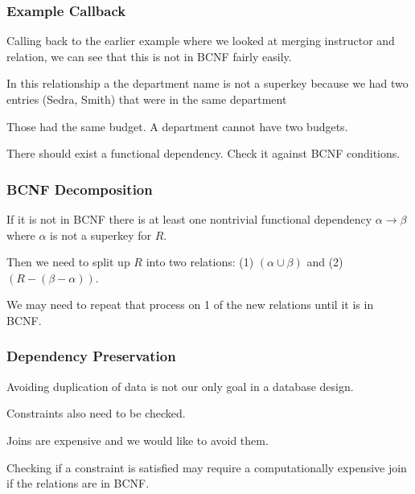\begin{frame}
\frametitle{Example Callback}
Calling back to the earlier example where we looked at merging instructor and relation, we can see that this is not in BCNF fairly easily. 

In this relationship a the department name is not a superkey because we had two entries (Sedra, Smith) that were in the same department 

Those had the same budget. A department cannot have two budgets.

There should exist a functional dependency. Check it against BCNF conditions.

\end{frame}


\begin{frame}
\frametitle{BCNF Decomposition}

If it is not in BCNF there is at least one nontrivial functional dependency $\alpha \rightarrow \beta$ where $\alpha$ is not a superkey for $R$. 

Then we need to split up $R$ into two relations: (1) $(\alpha \cup \beta)$ and (2) $(R - (\beta - \alpha))$. 


We may need to repeat that process on 1 of the new relations until it is in BCNF.


\end{frame}



\begin{frame}
\frametitle{Dependency Preservation}

 Avoiding duplication of data is not our only goal in a database design. 
 
 Constraints also need to be checked. 
 
Joins are expensive and we would like to avoid them. 
 
 Checking if a constraint is satisfied may require a computationally expensive join if the relations are in BCNF.


\end{frame}



